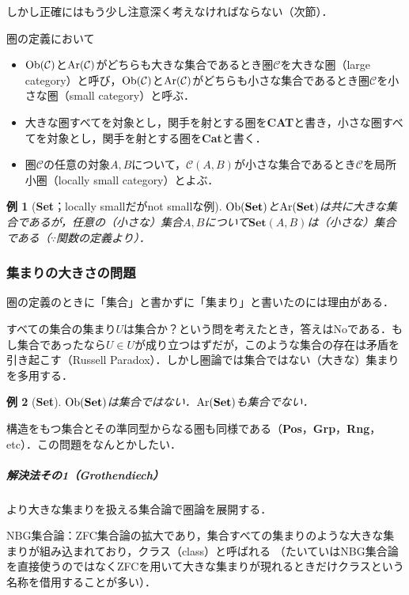 \documentclass[dvipdfmx,a4j,10pt]{jsarticle}
\theoremstyle{mystyle1}
\theoremstyle{mystyle2}
\newtheorem{example}{例}
\newcommand{\Ob}{{\rm Ob}}
\newcommand{\Ar}{{\rm Ar}}
\begin{document}
しかし正確にはもう少し注意深く考えなければならない（次節）．

圏の定義において
\begin{itemize}
    \item $\Ob(\mathcal{C})$と$\Ar(\mathcal{C})$がどちらも大きな集合であるとき圏$\mathcal{C}$を大きな圏（large category）と呼び，$\Ob(\mathcal{C})$と$\Ar(\mathcal{C})$がどちらも小さな集合であるとき圏$\mathcal{C}$を小さな圏（small category）と呼ぶ．
    \item 大きな圏すべてを対象とし，関手を射とする圏を\textbf{CAT}と書き，小さな圏すべてを対象とし，関手を射とする圏を\textbf{Cat}と書く．
    \item 圏$\mathcal{C}$の任意の対象$A,B$について，$\mathcal{C}(A,B)$が小さな集合であるとき$\mathcal{C}$を局所小圏（locally small category）とよぶ．
\end{itemize}

\begin{example}[\textbf{Set}；locally smallだがnot smallな例]
    $\Ob(\textbf{Set})$と$\Ar(\textbf{Set})$は共に大きな集合であるが，任意の（小さな）集合$A,B$について$\textbf{Set}(A,B)$は（小さな）集合である（$\because$関数の定義より）．
\end{example}

\subsubsection{集まりの大きさの問題}

圏の定義のときに「集合」と書かずに「集まり」と書いたのには理由がある．

すべての集合の集まり$U$は集合か？という問を考えたとき，答えはNoである．もし集合であったなら$U\in U$が成り立つはずだが，このような集合の存在は矛盾を引き起こす（Russell Paradox）．しかし圏論では集合ではない（大きな）集まりを多用する．
\begin{example}[\textbf{Set}]
    $\Ob(\textbf{Set})$は集合ではない．$\Ar(\textbf{Set})$も集合でない．
\end{example}
構造をもつ集合とその準同型からなる圏も同様である（\textbf{Pos}，\textbf{Grp}，\textbf{Rng}，etc）．この問題をなんとかしたい．

\vspace{0.5\baselineskip}

\subparagraph{解決法その1（Grothendiech）}

より大きな集まりを扱える集合論で圏論を展開する．

NBG集合論：ZFC集合論の拡大であり，集合すべての集まりのような大きな集まりが組み込まれており，クラス（class）と呼ばれる
（たいていはNBG集合論を直接使うのではなくZFCを用いて大きな集まりが現れるときだけクラスという名称を借用することが多い）．
\end{document}
